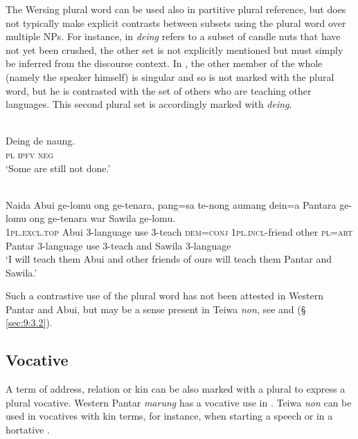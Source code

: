 The Wersing plural word can be used also in partitive plural reference, but does not typically make explicit contrasts between subsets using the plural word over multiple NPs. For instance, in  \textit{deing} refers to a subset of candle nuts that have not yet been crushed, the other set is not explicitly mentioned but must simply be inferred from the discourse context. In , the other member of the whole (namely the speaker himself) is singular and so is not marked with the plural word, but he is contrasted with the set of others who are teaching other languages. This second plural set is accordingly marked with \textit{deing}.


\ea%
\label{ex:9:86}
 \\
\gll Deing de naung. \\
 \textsc{pl} \textsc{ipfv} \textsc{neg}   \\
\glt `Some are still not done.'
\z







\ea%
\label{ex:9:87}
 \\
\gll  Naida Abui ge-lomu ong ge-tenara,  pang=sa te-nong aumang dein=a  Pantara ge-lomu ong ge-tenara war Sawila ge-lomu. \\
  \textsc{1pl.excl.top} Abui 3-language use 3-teach  \textsc{dem=conj} \textsc{1pl.incl}-friend other \textsc{pl=art}   Pantar 3-language use 3-teach and Sawila 3-language  \\
\glt `I will teach them Abui and other friends of ours  will teach them Pantar and Sawila.'
\z

Such a contrastive use of the plural word has not been attested in Western Pantar and Abui, but may be a sense present in Teiwa \textit{non}, see  and  ({\S} \ref{sec:9:3.2}).

\subsection{Vocative} %
\label{sec:9:4.5}
A term of address, relation or kin can be also marked with a plural to express a plural vocative. Western Pantar \textit{marung} has a vocative use in . Teiwa \textit{non} can be used in vocatives with kin terms, for instance, when starting a speech  or in a hortative .


